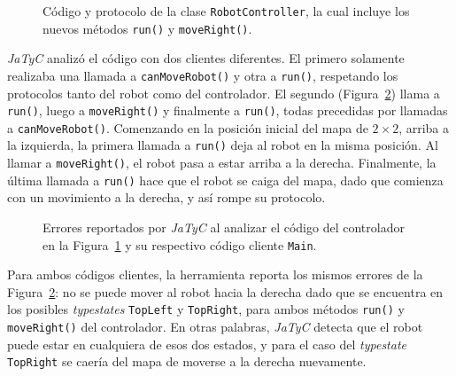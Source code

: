 \begin{figure}[htbp]
    \centering
    
    \vspace{0.3cm}
    
    \caption{Código y protocolo de la clase \texttt{RobotController}, la cual incluye los nuevos métodos \texttt{run()} y \texttt{moveRight()}.}
    \label{exp:compound-3:controller}
\end{figure}

\textit{JaTyC} analizó el código con dos clientes diferentes. El primero solamente realizaba una llamada a \texttt{canMoveRobot()} y otra a \texttt{run()}, respetando los protocolos tanto del robot como del controlador. El segundo (Figura~\ref{exp:compound-3:error}) llama a \texttt{run()}, luego a \texttt{moveRight()} y finalmente a \texttt{run()}, todas precedidas por llamadas a \texttt{canMoveRobot()}. Comenzando en la posición inicial del mapa de $2\times2$, arriba a la izquierda, la primera llamada a \texttt{run()} deja al robot en la misma posición. Al llamar a \texttt{moveRight()}, el robot pasa a estar arriba a la derecha. Finalmente, la última llamada a \texttt{run()} hace que el robot se caiga del mapa, dado que comienza con un movimiento a la derecha, y así rompe su protocolo.

\begin{figure}[htbp]
    \centering
    
    \vspace{0.3cm}
    
    \caption{Errores reportados por \textit{JaTyC} al analizar el código del controlador en la Figura~\ref{exp:compound-3:controller} y su respectivo código cliente \texttt{Main}.}
    \label{exp:compound-3:error}
\end{figure}

Para ambos códigos clientes, la herramienta reporta los mismos errores de la Figura~\ref{exp:compound-3:error}: no se puede mover al robot hacia la derecha dado que se encuentra en los posibles \textit{typestates} \texttt{TopLeft} y \texttt{TopRight}, para ambos métodos \texttt{run()} y \texttt{moveRight()} del controlador. En otras palabras, \textit{JaTyC} detecta que el robot puede estar en cualquiera de esos dos estados, y para el caso del \textit{typestate} \texttt{TopRight} se caería del mapa de moverse a la derecha nuevamente.

